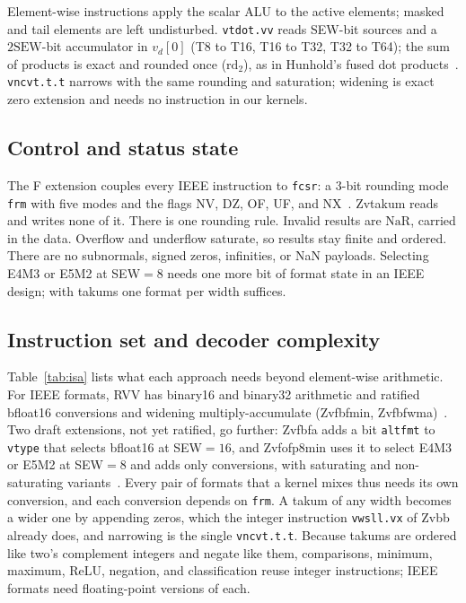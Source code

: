 \documentclass[conference]{IEEEtran}
\newcommand{\NaR}{\mathrm{NaR}}
\newcommand{\code}[1]{\texttt{#1}}
\begin{document}
Element-wise instructions apply the scalar ALU to the active elements; masked
and tail elements are left undisturbed. \code{vtdot.vv} reads SEW-bit sources
and a $2\mathrm{SEW}$-bit accumulator in $v_d[0]$ (T8 to T16, T16 to T32, T32
to T64); the sum of products is exact and rounded once ($\mathrm{rd}_2$), as in
Hunhold's fused dot products~\cite{simd}. \code{vncvt.t.t} narrows with the
same rounding and saturation; widening is exact zero extension and needs no
instruction in our kernels.

\subsection{Control and status state}
The F extension couples every IEEE instruction to \code{fcsr}: a 3-bit
rounding mode \code{frm} with five modes and the flags NV, DZ, OF, UF, and
NX~\cite{rvunpriv}. Zvtakum reads and writes none of it. There is one rounding
rule. Invalid results are $\NaR$, carried in the data. Overflow and underflow
saturate, so results stay finite and ordered. There are no subnormals, signed
zeros, infinities, or NaN payloads. Selecting E4M3 or E5M2 at SEW${}=8$ needs
one more bit of format state in an IEEE design; with takums one format per width
suffices.

\subsection{Instruction set and decoder complexity}\label{sec:static}
Table~\ref{tab:isa} lists what each approach needs beyond element-wise
arithmetic. For IEEE formats, RVV has binary16 and binary32 arithmetic and
ratified bfloat16 conversions and widening multiply-accumulate (Zvfbfmin,
Zvfbfwma)~\cite{rvunpriv}. Two draft extensions, not yet ratified, go further:
Zvfbfa adds a bit \code{altfmt} to \code{vtype} that selects bfloat16 at
SEW${}=16$, and Zvfofp8min uses it to select E4M3 or E5M2 at SEW${}=8$ and adds
only conversions, with saturating and non-saturating variants~\cite{rvdrafts}.
Every pair of formats that a kernel mixes thus needs its own conversion, and
each conversion depends on \code{frm}. A takum of any width becomes a wider one
by appending zeros, which the integer instruction \code{vwsll.vx} of Zvbb
already does, and narrowing is the single \code{vncvt.t.t}. Because takums are
ordered like two's complement integers and negate like them, comparisons,
minimum, maximum, ReLU, negation, and classification reuse integer
instructions; IEEE formats need floating-point versions of each.
\end{document}
